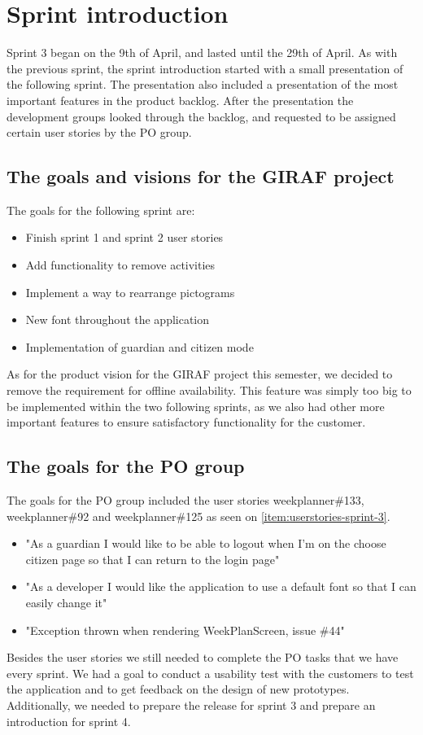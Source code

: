 \section{Sprint introduction}
Sprint 3 began on the 9th of April, and lasted until the 29th of April.
As with the previous sprint, the sprint introduction started with a small presentation of the following sprint. 
The presentation also included a presentation of the most important features in the product backlog.
After the presentation the development groups looked through the backlog, and requested to be assigned certain user stories by the PO group.

\subsection{The goals and visions for the GIRAF project}
The goals for the following sprint are:

\begin{itemize}
    \item Finish sprint 1 and sprint 2 user stories
    \item Add functionality to remove activities
    \item Implement a way to rearrange pictograms
    \item New font throughout the application
    \item Implementation of guardian and citizen mode
\end{itemize}

\noindent
As for the product vision for the GIRAF project this semester, we decided to remove the requirement for offline availability. 
This feature was simply too big to be implemented within the two following sprints, as we also had other more important features to ensure satisfactory functionality for the customer.

\subsection{The goals for the PO group}
The goals for the PO group included the user stories weekplanner\#133, weekplanner\#92 and weekplanner\#125 as seen on \autoref{item:userstories-sprint-3}.

\begin{itemize}\label{item:userstories-sprint-3}
    \item "As a guardian I would like to be able to logout when I'm on the choose citizen page so that I can return to the login page"
    \item "As a developer I would like the application to use a default font so that I can easily change it"
    \item "Exception thrown when rendering WeekPlanScreen, issue \#44"
\end{itemize}
\noindent
Besides the user stories we still needed to complete the PO tasks that we have every sprint.
We had a goal to conduct a usability test with the customers to test the application and to get feedback on the design of new prototypes.
Additionally, we needed to prepare the release for sprint 3 and prepare an introduction for sprint 4.

